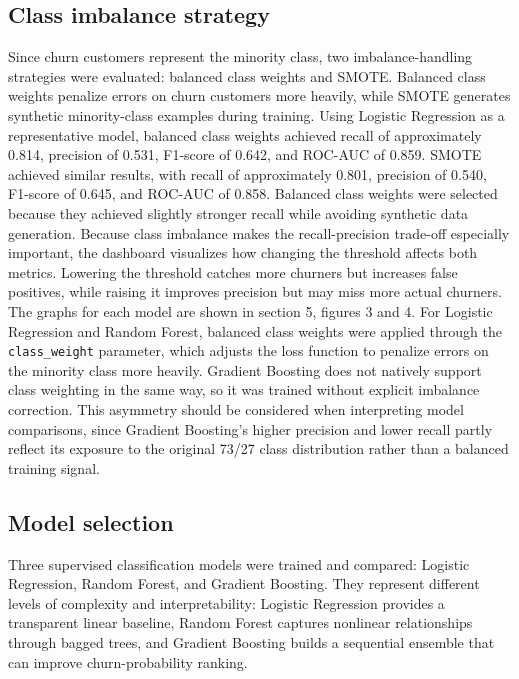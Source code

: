 \documentclass{article}
\begin{document}
\subsection{Class imbalance strategy}
Since churn customers represent the minority class, two imbalance-handling strategies were evaluated: balanced class weights and SMOTE. Balanced class weights penalize errors on churn customers more heavily, while SMOTE generates synthetic minority-class examples during training. Using Logistic Regression as a representative model, balanced class weights achieved recall of approximately 0.814, precision of 0.531, F1-score of 0.642, and ROC-AUC of 0.859. SMOTE achieved similar results, with recall of approximately 0.801, precision of 0.540, F1-score of 0.645, and ROC-AUC of 0.858. Balanced class weights were selected because they achieved slightly stronger recall while avoiding synthetic data generation. Because class imbalance makes the recall-precision trade-off especially important, the dashboard visualizes how changing the threshold affects both metrics. Lowering the threshold catches more churners but increases false positives, while raising it improves precision but may miss more actual churners. The graphs for each model are shown in section 5, figures 3 and 4. For Logistic Regression and Random Forest, balanced class weights were applied through the \texttt{class\_weight} parameter, which adjusts the loss function to penalize errors on the minority class more heavily. Gradient Boosting does not natively support class weighting in the same way, so it was trained without explicit imbalance correction. This asymmetry should be considered when interpreting model comparisons, since Gradient Boosting's higher precision and lower recall partly reflect its exposure to the original 73/27 class distribution rather than a balanced training signal.


\subsection{Model selection}
Three supervised classification models were trained and compared: Logistic Regression, Random Forest, and Gradient Boosting. They represent different levels of complexity and interpretability: Logistic Regression provides a transparent linear baseline, Random Forest captures nonlinear relationships through bagged trees, and Gradient Boosting builds a sequential ensemble that can improve churn-probability ranking.
\end{document}
